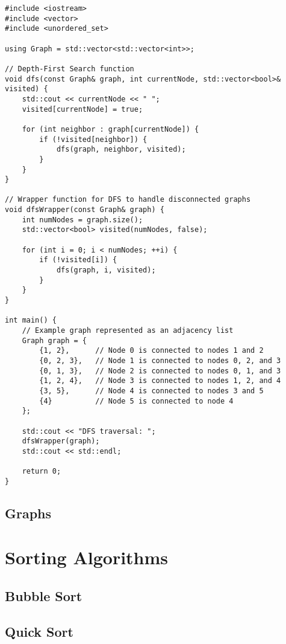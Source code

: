 \begin{verbatim}
#include <iostream>
#include <vector>
#include <unordered_set>

using Graph = std::vector<std::vector<int>>;

// Depth-First Search function
void dfs(const Graph& graph, int currentNode, std::vector<bool>& visited) {
    std::cout << currentNode << " ";
    visited[currentNode] = true;

    for (int neighbor : graph[currentNode]) {
        if (!visited[neighbor]) {
            dfs(graph, neighbor, visited);
        }
    }
}

// Wrapper function for DFS to handle disconnected graphs
void dfsWrapper(const Graph& graph) {
    int numNodes = graph.size();
    std::vector<bool> visited(numNodes, false);

    for (int i = 0; i < numNodes; ++i) {
        if (!visited[i]) {
            dfs(graph, i, visited);
        }
    }
}

int main() {
    // Example graph represented as an adjacency list
    Graph graph = {
        {1, 2},      // Node 0 is connected to nodes 1 and 2
        {0, 2, 3},   // Node 1 is connected to nodes 0, 2, and 3
        {0, 1, 3},   // Node 2 is connected to nodes 0, 1, and 3
        {1, 2, 4},   // Node 3 is connected to nodes 1, 2, and 4
        {3, 5},      // Node 4 is connected to nodes 3 and 5
        {4}          // Node 5 is connected to node 4
    };

    std::cout << "DFS traversal: ";
    dfsWrapper(graph);
    std::cout << std::endl;

    return 0;
}
\end{verbatim}

\section{Graphs}

\chapter{Sorting Algorithms}


\section{Bubble Sort}

\section{Quick Sort}


